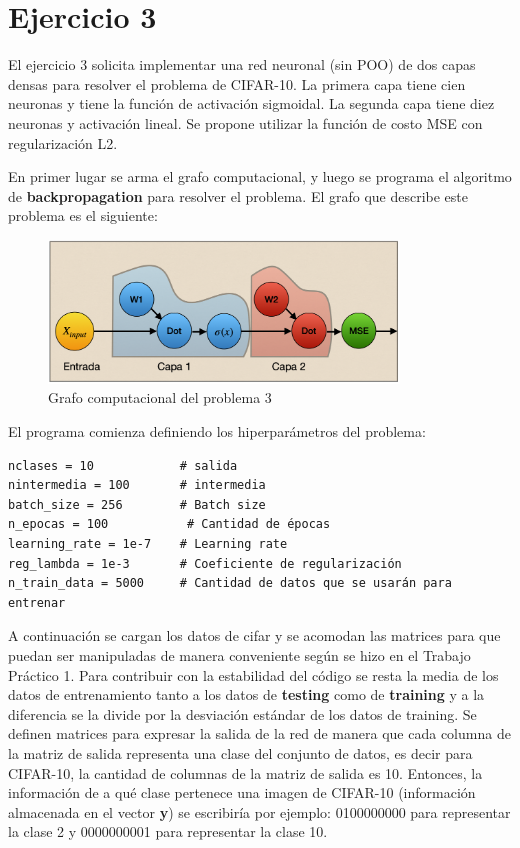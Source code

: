 \section{Ejercicio 3}

El ejercicio 3 solicita implementar una red neuronal (sin POO) de dos capas densas para resolver el problema de CIFAR-10. La primera capa tiene cien neuronas y tiene la función de activación sigmoidal. La segunda capa tiene diez neuronas y activación lineal.
Se propone utilizar la función de costo MSE con regularización L2.

En primer lugar se arma el grafo computacional, y luego se programa el algoritmo de \textbf{backpropagation} para resolver el problema.
El grafo que describe este problema es el siguiente:

\begin{figure}[H]
    \centering
    \includegraphics[height=1.5in]{image/graph3}
    \caption{Grafo computacional del problema 3}
    \label{fig:my_label}
\end{figure}

El programa comienza definiendo los hiperparámetros del problema:
\begin{verbatim}
nclases = 10            # salida
nintermedia = 100       # intermedia
batch_size = 256        # Batch size
n_epocas = 100           # Cantidad de épocas
learning_rate = 1e-7    # Learning rate
reg_lambda = 1e-3       # Coeficiente de regularización
n_train_data = 5000     # Cantidad de datos que se usarán para entrenar

\end{verbatim}
A continuación se cargan los datos de cifar y se acomodan las matrices para que puedan ser manipuladas de manera conveniente según se hizo en el Trabajo Práctico 1.
Para contribuir con la estabilidad del código se resta la media de los datos de entrenamiento tanto a los datos de \textbf{testing} como de \textbf{training} y a la diferencia se la divide por la desviación estándar de los datos de training.
Se definen matrices para expresar la salida de la red de manera que cada columna de la matriz de salida representa una clase del conjunto de datos, es decir para CIFAR-10, la cantidad de columnas de la matriz de salida es 10. Entonces, la información de a qué clase pertenece una imagen de CIFAR-10 (información almacenada en el vector \textbf{y}) se escribiría por ejemplo: 0100000000 para representar la clase 2 y 0000000001 para representar la clase 10.

